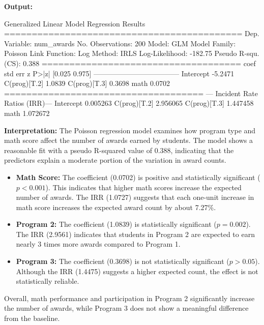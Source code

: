 \documentclass[12pt,a4paper]{article}
\begin{document}
\textbf{Output:}
\begin{codebox}
Generalized Linear Model Regression Results
===========================================
Dep. Variable: num_awards
No. Observations: 200
Model: GLM
Model Family: Poisson
Link Function: Log
Method: IRLS
Log-Likelihood: -182.75
Pseudo R-squ. (CS): 0.388
====================================
coef std err z P>|z| [0.025 0.975]
------------------------------------
Intercept -5.2471
C(prog)[T.2] 1.0839
C(prog)[T.3] 0.3698
math 0.0702
====================================
--- Incident Rate Ratios (IRR)---
Intercept 0.005263
C(prog)[T.2] 2.956065
C(prog)[T.3] 1.447458
math 1.072672
\end{codebox}

\textbf{Interpretation:}
The Poisson regression model examines how program type and math score affect the number of awards earned by students.
The model shows a reasonable fit with a pseudo R-squared value of 0.388, indicating that the predictors explain a moderate portion of the variation in award counts.
\begin{itemize}
\item \textbf{Math Score:} The coefficient (0.0702) is positive and statistically significant ($p < 0.001$).
This indicates that higher math scores increase the expected number of awards.
The IRR (1.0727) suggests that each one-unit increase in math score increases the expected award count by about 7.27\%.
\item \textbf{Program 2:} The coefficient (1.0839) is statistically significant ($p = 0.002$).
The IRR (2.9561) indicates that students in Program 2 are expected to earn nearly 3 times more awards compared to Program 1.
\item \textbf{Program 3:} The coefficient (0.3698) is not statistically significant ($p > 0.05$).
Although the IRR (1.4475) suggests a higher expected count, the effect is not statistically reliable.
\end{itemize}
Overall, math performance and participation in Program 2 significantly increase the number of awards, while Program 3 does not show a meaningful difference from the baseline.
\end{document}
